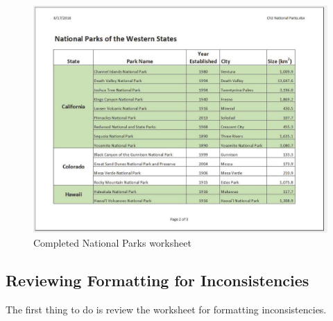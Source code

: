 \begin{figure}[H]
	\centering
	\includegraphics[width=\maxwidth{.95\linewidth}]{gfx/ch03_fig26}
	\caption{Completed National Parks worksheet}
	\label{03:fig26}
\end{figure}

\subsection{Reviewing Formatting for Inconsistencies}

The first thing to do is review the worksheet for formatting inconsistencies.

